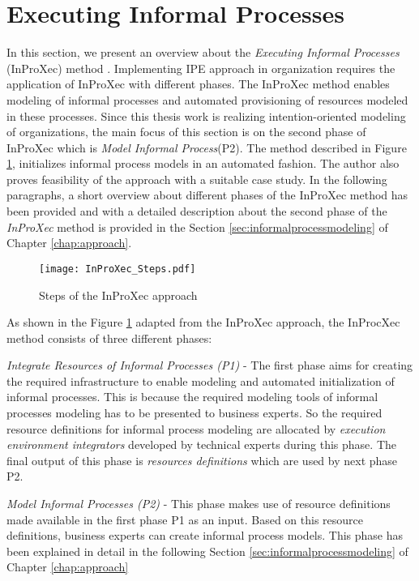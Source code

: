 \section{Executing Informal Processes}
\label{sec:inproxec}
In this section, we present an overview about the \textit{Executing Informal Processes} (InProXec) method \cite{Sungur2015}. Implementing IPE approach in organization requires the application of InProXec with different phases. The InProXec method enables modeling of informal processes and automated provisioning of resources modeled in these processes. Since this thesis work is realizing intention-oriented modeling of organizations, the main focus of this section is on the second phase of InProXec which is \textit{Model Informal Process}(P2). The method described in Figure \ref{fig:inprocxec_steps}, initializes informal process models in an automated fashion. The author also proves feasibility of the approach with a suitable case study. In the following paragraphs, a short overview about different phases of the InProXec method has been provided and with a detailed description about the second phase of the \textit{InProXec} method is provided in the Section \ref{sec:informalprocessmodeling} of Chapter \ref{chap:approach}. 

\begin{figure}
	\centering
	\texttt{[image: InProXec\_Steps.pdf]}
	\caption{Steps of the InProXec approach}
	\label{fig:inprocxec_steps}
\end{figure} 

As shown in the Figure \ref{fig:inprocxec_steps} adapted from the InProXec approach, the InProcXec method consists of three different phases:

\textit{Integrate Resources of Informal Processes (P1)} - The first phase aims for creating the required infrastructure to enable modeling and automated initialization of informal processes. This is because the required modeling tools of informal processes modeling has to be presented to  business experts. So the required resource definitions for informal process modeling are allocated by \textit{execution environment integrators} developed by technical experts during this phase. The final output of this phase is \textit{resources definitions} which are used by next phase P2. 

\textit{Model Informal Processes (P2)} - This phase makes use of resource definitions made available in the first phase P1 as an input.  Based on this resource definitions, business experts can create informal process models. This phase has been explained in detail in the following Section \ref{sec:informalprocessmodeling} of Chapter \ref{chap:approach}

